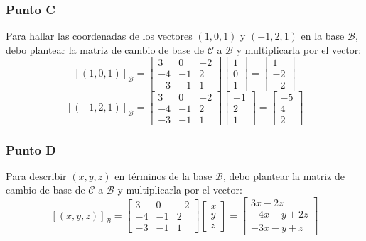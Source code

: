 \documentclass[a4paper,12pt]{article}
\begin{document}
\subsubsection{Punto C}
Para hallar las coordenadas de los vectores $(1,0,1)$ y $(-1,2,1)$ en la base $\mathcal{B}$, debo plantear la matriz de cambio de base de $\mathcal{C}$ a $\mathcal{B}$ y multiplicarla por el vector:
$$
[(1,0,1)]_{\mathcal{B}} = \begin{bmatrix}
    3 & 0 & -2 \\ 
    -4 & -1 & 2 \\ 
    -3 & -1 & 1
\end{bmatrix}
\begin{bmatrix}
    1 \\ 
    0 \\ 
    1
\end{bmatrix}
=
\begin{bmatrix}
    1 \\ 
    -2 \\ 
    -2
\end{bmatrix}
$$
$$
[(-1,2,1)]_{\mathcal{B}} = \begin{bmatrix}
    3 & 0 & -2 \\ 
    -4 & -1 & 2 \\ 
    -3 & -1 & 1
\end{bmatrix}
\begin{bmatrix}
    -1 \\ 
    2 \\ 
    1
\end{bmatrix}
=
\begin{bmatrix}
    -5 \\ 
    4 \\ 
    2
\end{bmatrix}
$$
\subsubsection{Punto D}
Para describir $(x,y,z)$ en términos de la base $\mathcal{B}$, debo plantear la matriz de cambio de base de $\mathcal{C}$ a $\mathcal{B}$ y multiplicarla por el vector:
$$
[(x,y,z)]_{\mathcal{B}} = \begin{bmatrix}
    3 & 0 & -2 \\ 
    -4 & -1 & 2 \\ 
    -3 & -1 & 1
\end{bmatrix}
\begin{bmatrix}
    x \\ 
    y \\ 
    z
\end{bmatrix}
=
\begin{bmatrix}
    3x-2z \\ 
    -4x-y+2z \\ 
    -3x-y+z
\end{bmatrix}
$$
\end{document}
